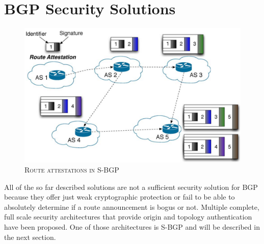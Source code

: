 \documentclass[12pt,a4paper]{IEEEtran}
\begin{document}
       
			\section{BGP Security Solutions}

		\begin{figure}[ht!]
			\begin{center}
				\includegraphics[scale=1.337]{sbgp.png}
				\caption{\textsc{Route attestations in S-BGP \citep{2010}}}
			\end{center}
			\label{sbgp}
		\end{figure}
		All of the so far described solutions are not a sufficient security solution for BGP because they offer just weak cryptographic protection or fail to be able to absolutely determine if a route announcement is bogus or not. Multiple complete, full scale security architectures that provide origin and topology authentication have been proposed. One of those architectures is S-BGP and will be described in the next section.
\end{document}

